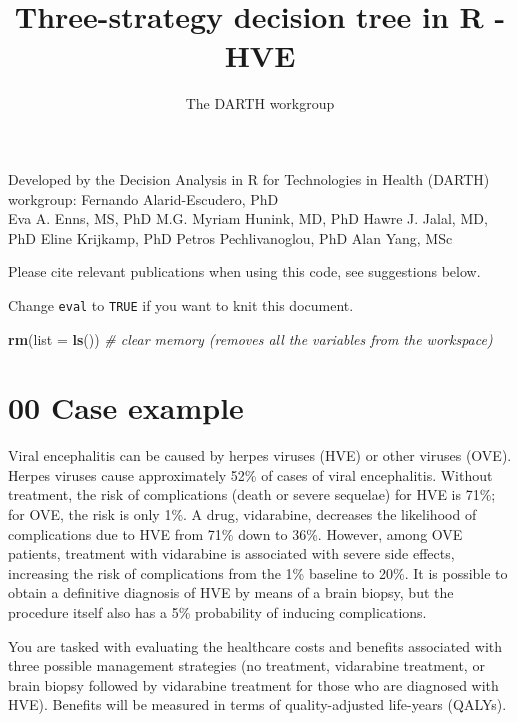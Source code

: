 \documentclass[
]{article}
\title{Three-strategy decision tree in R - HVE}
\author{The DARTH workgroup}
\date{}
\newenvironment{Shaded}{\begin{snugshade}}{\end{snugshade}}
\newcommand{\AttributeTok}[1]{\textcolor[rgb]{0.13,0.29,0.53}{#1}}
\newcommand{\CommentTok}[1]{\textcolor[rgb]{0.56,0.35,0.01}{\textit{#1}}}
\newcommand{\FunctionTok}[1]{\textcolor[rgb]{0.13,0.29,0.53}{\textbf{#1}}}
\newcommand{\NormalTok}[1]{#1}
\begin{document}
\maketitle

Developed by the Decision Analysis in R for Technologies in Health
(DARTH) workgroup: Fernando Alarid-Escudero, PhD\\
Eva A. Enns, MS, PhD M.G. Myriam Hunink, MD, PhD Hawre J. Jalal, MD, PhD
Eline Krijkamp, PhD Petros Pechlivanoglou, PhD Alan Yang, MSc

Please cite relevant publications when using this code, see suggestions
below.

\newpage

Change \texttt{eval} to \texttt{TRUE} if you want to knit this document.

\begin{Shaded}
\begin{Highlighting}[]
\FunctionTok{rm}\NormalTok{(}\AttributeTok{list =} \FunctionTok{ls}\NormalTok{())      }\CommentTok{\# clear memory (removes all the variables from the workspace)}
\end{Highlighting}
\end{Shaded}

\hypertarget{case-example}{%
\section{00 Case example}\label{case-example}}

Viral encephalitis can be caused by herpes viruses (HVE) or other
viruses (OVE). Herpes viruses cause approximately 52\% of cases of viral
encephalitis. Without treatment, the risk of complications (death or
severe sequelae) for HVE is 71\%; for OVE, the risk is only 1\%. A drug,
vidarabine, decreases the likelihood of complications due to HVE from
71\% down to 36\%. However, among OVE patients, treatment with
vidarabine is associated with severe side effects, increasing the risk
of complications from the 1\% baseline to 20\%. It is possible to obtain
a definitive diagnosis of HVE by means of a brain biopsy, but the
procedure itself also has a 5\% probability of inducing complications.

You are tasked with evaluating the healthcare costs and benefits
associated with three possible management strategies (no treatment,
vidarabine treatment, or brain biopsy followed by vidarabine treatment
for those who are diagnosed with HVE). Benefits will be measured in
terms of quality-adjusted life-years (QALYs).
\end{document}
